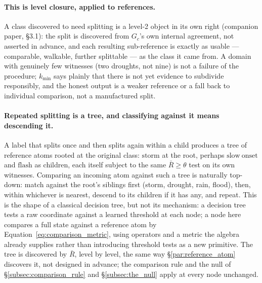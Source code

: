 \documentclass[12pt, a4paper]{article}
\begin{document}
\paragraph{This is level closure, applied to references.} A class
discovered to need splitting is a level-2 object in its own right
(companion paper, \S3.1): the split is discovered from $G_c$'s own
internal agreement, not asserted in advance, and each resulting
sub-reference is exactly as usable --- comparable, walkable, further
splittable --- as the class it came from. A domain with genuinely
few witnesses (two droughts, not nine) is not a failure of the
procedure; $k_{\min}$ says plainly that there is not yet evidence to
subdivide responsibly, and the honest output is a weaker reference or
a fall back to individual comparison, not a manufactured split.

\paragraph{Repeated splitting is a tree, and classifying against it
means descending it.} A label that splits once and then splits again
within a child produces a tree of reference atoms rooted at the
original class: $\mathrm{storm}$ at the root, perhaps $\mathrm{slow\
onset}$ and $\mathrm{flash}$ as children, each itself subject to the
same $\bar R\ge\theta$ test on its own witnesses. Comparing an
incoming atom against such a tree is naturally top-down: match against
the root's siblings first (storm, drought, rain, flood), then, within
whichever is nearest, descend to its children if it has any, and
repeat. This is the shape of a classical decision tree, but not its
mechanism: a decision tree tests a raw coordinate against a learned
threshold at each node; a node here compares a full state against a
reference atom by Equation~\eqref{eq:comparison_metric}, using
operators and a metric the algebra already supplies rather than
introducing threshold tests as a new primitive. The tree is discovered
by $\bar R$, level by level, the same way \S\ref{par:reference_atom}
discovers it, not designed in advance; the comparison rule and the
null of \S\ref{subsec:comparison_rule} and \S\ref{subsec:the_null}
apply at every node unchanged.
\end{document}
